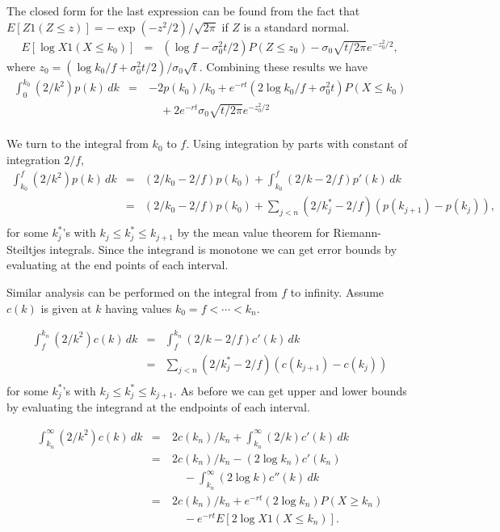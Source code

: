 \documentclass[11pt,fleqn]{amsart}
\begin{document}
The closed form for the last expression can be found
from the fact that $E[Z 1(Z \le z)] = -\exp(-z^2/2)/\sqrt{2\pi}$
if $Z$ is a standard normal.
\begin{eqnarray*}
	E[\log X 1(X \le k_0)] &=& (\log f - \sigma_0^2 t/2) P(Z \le z_0)
		- \sigma_0\sqrt{t/2\pi} e^{-z_0^2/2},
\end{eqnarray*}
where $z_0 = (\log k_0/f + \sigma_0^2 t/2)/\sigma_0\sqrt{t}$.
Combining these results we have
\begin{eqnarray*}
	\int_0^{k_0} (2/k^2) p(k)\,dk
	&=& -2p(k_0)/k_0 + e^{-rt}(2\log k_0/f + \sigma_0^2 t) P(X \le k_0) \\
	&\quad&\quad + 2e^{-rt}\sigma_0\sqrt{t/2\pi} e^{-z_0^2/2} \\
\end{eqnarray*}

We turn to the integral from $k_0$ to $f$.  Using integration
by parts with constant of integration $2/f$,
\begin{eqnarray*}
\int_{k_0}^f (2/k^2) p(k)\,dk
	&=& (2/k_0 - 2/f) p(k_0)
		+ \int_{k_0}^f (2/k - 2/f) p'(k)\,dk\\
	&=& (2/k_0 - 2/f) p(k_0)
		+ \sum_{j < n} (2/k_j^* - 2/f) (p(k_{j+1}) - p(k_j)),\\
\end{eqnarray*}
for some $k_j^*$'s with $k_j \le k_j^* \le k_{j + 1}$ by the
mean value theorem for Riemann-Steiltjes integrals.
Since the integrand is monotone we can get error bounds
by evaluating at the end points of each interval.

Similar analysis can be performed on the integral from $f$ to infinity.
Assume $c(k)$ is given at $k$ having values $k_0 = f < \cdots < k_n$.

\begin{eqnarray*}
\int_f^{k_n} (2/k^2) c(k)\,dk
	&=& \int_f^{k_n} (2/k - 2/f) c'(k)\,dk \\
	&=& \sum_{j < n} (2/k_j^* - 2/f) (c(k_{j+1}) - c(k_j))\\
\end{eqnarray*}
for some $k_j^*$'s with $k_j \le k_j^* \le k_{j + 1}$. As before
we can get upper and lower bounds by evaluating the integrand
at the endpoints of each interval.

\begin{eqnarray*}
\int_{k_n}^\infty (2/k^2) c(k)\,dk
	&=& 2c(k_n)/k_n + \int_{k_n}^\infty (2/k) c'(k)\,dk \\
	&=& 2c(k_n)/k_n - (2\log k_n) c'(k_n) \\
	&\quad&\quad - \int_{k_n}^\infty (2\log k) c''(k)\,dk \\
	&=& 2c(k_n)/k_n + e^{-rt}(2\log k_n) P(X \ge k_n) \\
	&\quad&\quad -e^{-rt}E[2\log X 1(X \le k_n)].\\
\end{eqnarray*}
\end{document}
